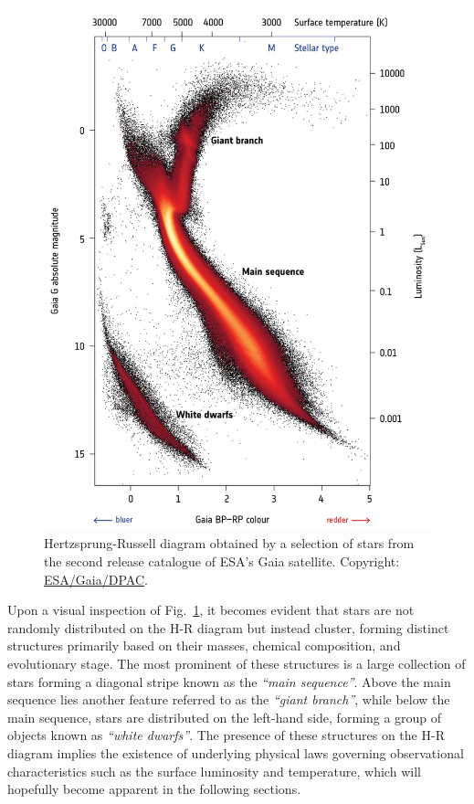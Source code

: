 \documentclass[main.tex]{subfiles}
\begin{document}
    \begin{figure}[h!]
        \centering
        \includegraphics[scale=1.1]{figures/chapter1/hrd_gaia.jpg}
        \caption{Hertzsprung-Russell diagram obtained by a selection of stars from the second release catalogue of ESA's Gaia satellite. Copyright: \href{https://sci.esa.int/web/gaia/-/60198-gaia-hertzsprung-russell-diagram}{ESA/Gaia/DPAC}.}
        \label{fig:hrd_gaia}
    \end{figure}

    Upon a visual inspection of Fig.~\ref{fig:hrd_gaia}, it becomes evident that stars are not randomly distributed on the H-R diagram but instead cluster, forming distinct structures primarily based on their masses, chemical composition, and evolutionary stage. The most prominent of these structures is a large collection of stars forming a diagonal stripe known as the \textit{``main sequence''}. Above the main sequence lies another feature referred to as the \textit{``giant branch''}, while below the main sequence, stars are distributed on the left-hand side, forming a group of objects known as \textit{``white dwarfs''}. The presence of these structures on the H-R diagram implies the existence of underlying physical laws governing observational characteristics such as the surface luminosity and temperature, which will hopefully become apparent in the following sections.
\end{document}
